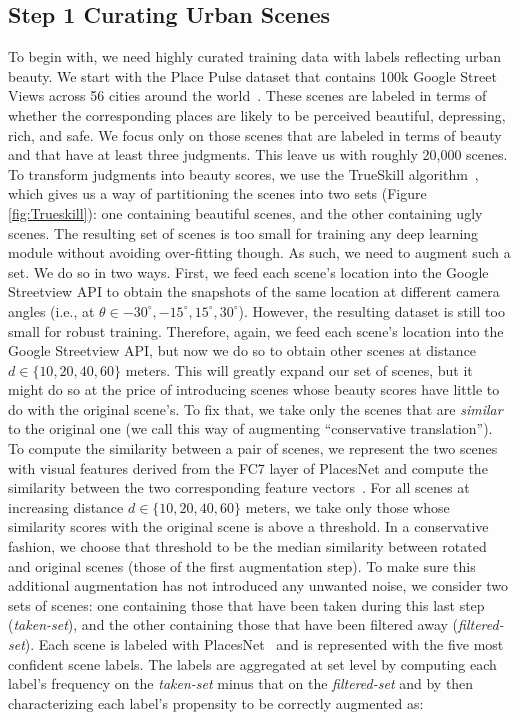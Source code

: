 \subsection*{Step 1 Curating Urban Scenes}
To begin with, we need highly curated training data with labels reflecting urban beauty. We start with the  Place Pulse dataset that contains 100k Google Street Views across 56 cities around the world~\cite{dubey2016deep}. These scenes are labeled in terms of whether the corresponding places are likely to be perceived beautiful, depressing, rich, and safe. We focus only on those scenes that are labeled in terms of beauty and that have at least three judgments. This leave us with roughly  20,000 scenes. To transform judgments into beauty scores, we use the TrueSkill algorithm~\cite{herbrich2007trueskill}, which gives us a way of partitioning the scenes into two sets (Figure \ref{fig:Trueskill}): one containing beautiful scenes, and the other containing ugly scenes. The resulting set of scenes is too small for training any deep learning module without avoiding over-fitting though. As such, we need to augment such a set. We do so in two ways. First, we feed each scene's location into the Google Streetview API to obtain  the snapshots of the same location at different camera angles (i.e., at $\theta \in {-30^{\circ}, -15^{\circ} , 15^{\circ} , 30^{\circ} }$). However, the resulting dataset is still too small for robust training. Therefore, again, we feed each scene's location into the Google Streetview API, but now we do so to obtain other scenes at  distance $d \in \{10,20,40,60\}$ meters.  This will greatly expand our set of scenes, but it might do so at the price of introducing scenes whose beauty scores have little to do with the original scene's. To fix that, we take only the scenes that are \emph{similar} to the original one (we call this way of augmenting ``conservative translation''). To compute the similarity between a pair of scenes, we represent the two scenes with visual features derived from the FC7 layer of PlacesNet and compute the similarity between the two corresponding feature vectors~\cite{zhou2014learning}. For all scenes at increasing distance $d \in \{10,20,40,60\}$ meters,  we take only those whose similarity scores with the original scene is above a threshold. In a conservative fashion, we choose that threshold to be the median similarity between rotated and original scenes (those of the first augmentation step). To make sure this additional augmentation has not introduced any unwanted noise, we consider  two sets of scenes: one containing those that have been taken during this last step (\emph{taken-set}), and the other containing those that have been filtered away (\emph{filtered-set}). Each scene is labeled with PlacesNet~\cite{zhou2014learning} and is represented with the five most confident scene labels. The labels are aggregated  at set level by computing each label's frequency on the \emph{taken-set} minus that on the \emph{filtered-set} and by then characterizing each label's propensity to be correctly augmented as: 
